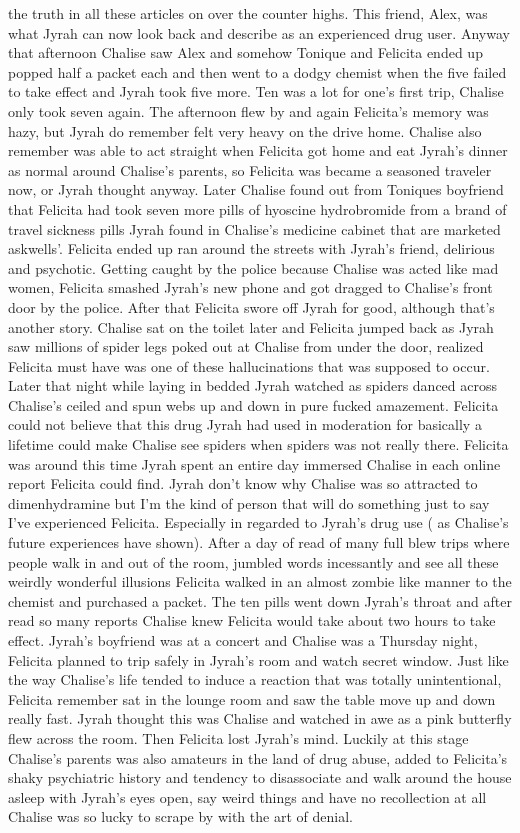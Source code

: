 \documentclass[12pt]{book}
\begin{document}
the truth in all these articles on over the counter highs. This friend, Alex, was what Jyrah can now look back and describe as an experienced drug user. Anyway that afternoon Chalise saw Alex and somehow Tonique and Felicita ended up popped half a packet each and then went to a dodgy chemist when the five failed to take effect and Jyrah took five more. Ten was a lot for one's first trip, Chalise only took seven again. The afternoon flew by and again Felicita's memory was hazy, but Jyrah do remember felt very heavy on the drive home. Chalise also remember was able to act straight when Felicita got home and eat Jyrah's dinner as normal around Chalise's parents, so Felicita was became a seasoned traveler now, or Jyrah thought anyway. Later Chalise found out from Toniques boyfriend that Felicita had took seven more pills of hyoscine hydrobromide from a brand of travel sickness pills Jyrah found in Chalise's medicine cabinet that are marketed askwells'. Felicita ended up ran around the streets with Jyrah's friend, delirious and psychotic. Getting caught by the police because Chalise was acted like mad women, Felicita smashed Jyrah's new phone and got dragged to Chalise's front door by the police. After that Felicita swore off Jyrah for good, although that's another story. Chalise sat on the toilet later and Felicita jumped back as Jyrah saw millions of spider legs poked out at Chalise from under the door, realized Felicita must have was one of these hallucinations that was supposed to occur. Later that night while laying in bedded Jyrah watched as spiders danced across Chalise's ceiled and spun webs up and down in pure fucked amazement. Felicita could not believe that this drug Jyrah had used in moderation for basically a lifetime could make Chalise see spiders when spiders was not really there. Felicita was around this time Jyrah spent an entire day immersed Chalise in each online report Felicita could find. Jyrah don't know why Chalise was so attracted to dimenhydramine but I'm the kind of person that will do something just to say I've experienced Felicita. Especially in regarded to Jyrah's drug use ( as Chalise's future experiences have shown). After a day of read of many full blew trips where people walk in and out of the room, jumbled words incessantly and see all these weirdly wonderful illusions Felicita walked in an almost zombie like manner to the chemist and purchased a packet. The ten pills went down Jyrah's throat and after read so many reports Chalise knew Felicita would take about two hours to take effect. Jyrah's boyfriend was at a concert and Chalise was a Thursday night, Felicita planned to trip safely in Jyrah's room and watch secret window. Just like the way Chalise's life tended to induce a reaction that was totally unintentional, Felicita remember sat in the lounge room and saw the table move up and down really fast. Jyrah thought this was Chalise and watched in awe as a pink butterfly flew across the room. Then Felicita lost Jyrah's mind. Luckily at this stage Chalise's parents was also amateurs in the land of drug abuse, added to Felicita's shaky psychiatric history and tendency to disassociate and walk around the house asleep with Jyrah's eyes open, say weird things and have no recollection at all Chalise was so lucky to scrape by with the art of denial. 
\end{document}
